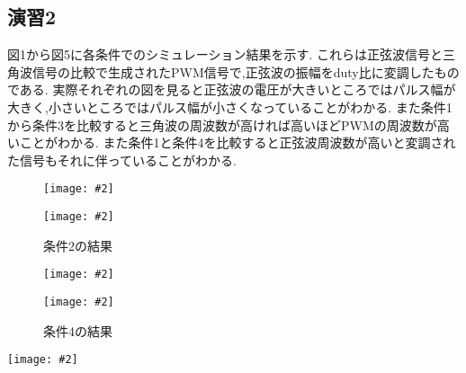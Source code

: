 \documentclass[uplatex,a4j,11pt,dvipdfmx]{jsarticle}
\makeatletter
\def\fgcaption{\def\@captype{figure}\caption}
\newcommand{\mfig}[3][width=15cm]{
\begin{center}
\texttt{[image: \#2]}
\fgcaption{#3 \label{fig:#2}}
\end{center}
}
\makeatother
\begin{document}
\subsection*{演習2}
図1から図5に各条件でのシミュレーション結果を示す.
これらは正弦波信号と三角波信号の比較で生成されたPWM信号で,正弦波の振幅をduty比に変調したものである.
実際それぞれの図を見ると正弦波の電圧が大きいところではパルス幅が大きく,小さいところではパルス幅が小さくなっていることがわかる.
また条件1から条件3を比較すると三角波の周波数が高ければ高いほどPWMの周波数が高いことがわかる.
また条件1と条件4を比較すると正弦波周波数が高いと変調された信号もそれに伴っていることがわかる.
\newpage
\begin{figure}[htbp]
  \begin{minipage}[b]{0.45\linewidth}
    \centering
    \mfig[width=6cm]{fig/fig1.png}{条件1の結果}
  \end{minipage}
  \begin{minipage}[b]{0.45\linewidth}
    \centering
    \mfig[width=6cm]{fig/fig2.png}{条件2の結果}
  \end{minipage}
\end{figure}
\newpage
\begin{figure}[htbp]
  \begin{minipage}[b]{0.45\linewidth}
    \centering
    \mfig[width=6cm]{fig/fig3.png}{条件3の結果}
  \end{minipage}
  \begin{minipage}[b]{0.45\linewidth}
    \centering
    \mfig[width=6cm]{fig/fig4.png}{条件4の結果}
  \end{minipage}
\end{figure}
\newpage
\mfig[width=6cm]{fig/fig5.png}{条件5の結果}
\end{document}
